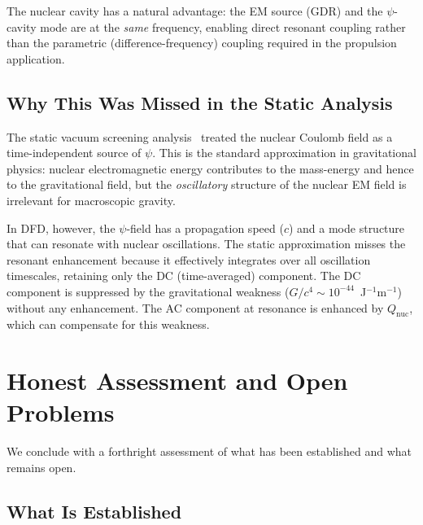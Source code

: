 \documentclass[aps,prd,twocolumn,superscriptaddress,nofootinbib]{revtex4-2}
\newcommand{\Qnuc}{Q_{\mathrm{nuc}}}
\begin{document}
The nuclear cavity has a natural advantage: the EM source (GDR) and
the $\psi$-cavity mode are at the \emph{same} frequency, enabling
direct resonant coupling rather than the parametric (difference-frequency)
coupling required in the propulsion application.

\subsection{Why This Was Missed in the Static Analysis}
\label{sec:why-missed}

The static vacuum screening analysis~\cite{Alcock2026VS} treated the
nuclear Coulomb field as a time-independent source of $\psi$.  This
is the standard approximation in gravitational physics: nuclear
electromagnetic energy contributes to the mass-energy and hence to
the gravitational field, but the \emph{oscillatory} structure of the
nuclear EM field is irrelevant for macroscopic gravity.

In DFD, however, the $\psi$-field has a propagation speed ($c$) and a
mode structure that can resonate with nuclear oscillations.  The static
approximation misses the resonant enhancement because it effectively
integrates over all oscillation timescales, retaining only the DC
(time-averaged) component.  The DC component is suppressed by the
gravitational weakness ($G/c^4 \sim 10^{-44}$~J$^{-1}$m$^{-1}$)
without any enhancement.  The AC component at resonance is enhanced
by $\Qnuc$, which can compensate for this weakness.


\section{Honest Assessment and Open Problems}
\label{sec:honest}

We conclude with a forthright assessment of what has been established
and what remains open.

\subsection{What Is Established}
\end{document}
